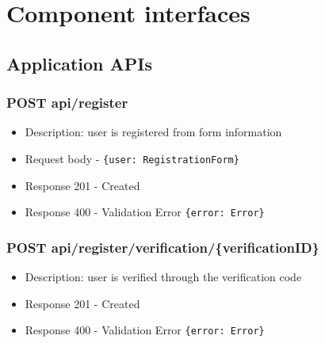 \begin{enumerate}[label=\textbf{RV\arabic* -}]
\begin{figure}[H]
    \centering
\end{figure}

\end{enumerate}

\section{Component interfaces}

\subsection{Application APIs}

\subsubsection{POST api/register}
\begin{itemize}
    \item Description: user is registered from form information
    \item Request body - \verb|{user: RegistrationForm}|
    \item Response 201 - Created
    \item Response 400 - Validation Error \verb|{error: Error}|
\end{itemize}

\subsubsection{POST api/register/verification/\{verificationID\}}
\begin{itemize}
    \item Description: user is verified through the verification code
    \item Response 201 - Created
    \item Response 400 - Validation Error \verb|{error: Error}|
\end{itemize}

